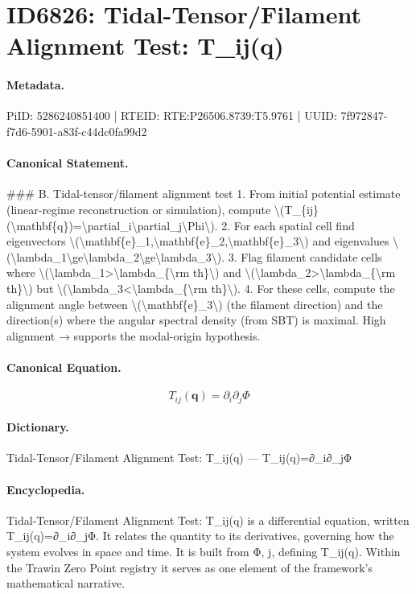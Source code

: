 \section*{ID6826: Tidal-Tensor/Filament Alignment Test: T\_ij(q)}
\paragraph{Metadata.}
PiID: 5286240851400 | RTEID: RTE:P26506.8739:T5.9761 | UUID: 7f972847-f7d6-5901-a83f-c44dc0fa99d2

\paragraph{Canonical Statement.}
\#\#\# B. Tidal-tensor/filament alignment test 1. From initial potential estimate (linear-regime reconstruction or simulation), compute \textbackslash{}(T\_\{ij\}(\textbackslash{}mathbf\{q\})=\textbackslash{}partial\_i\textbackslash{}partial\_j\textbackslash{}Phi\textbackslash{}). 2. For each spatial cell find eigenvectors \textbackslash{}(\textbackslash{}mathbf\{e\}\_1,\textbackslash{}mathbf\{e\}\_2,\textbackslash{}mathbf\{e\}\_3\textbackslash{}) and eigenvalues \textbackslash{}(\textbackslash{}lambda\_1\textbackslash{}ge\textbackslash{}lambda\_2\textbackslash{}ge\textbackslash{}lambda\_3\textbackslash{}). 3. Flag filament candidate cells where \textbackslash{}(\textbackslash{}lambda\_1>\textbackslash{}lambda\_\{\textbackslash{}rm th\}\textbackslash{}) and \textbackslash{}(\textbackslash{}lambda\_2>\textbackslash{}lambda\_\{\textbackslash{}rm th\}\textbackslash{}) but \textbackslash{}(\textbackslash{}lambda\_3<\textbackslash{}lambda\_\{\textbackslash{}rm th\}\textbackslash{}). 4. For these cells, compute the alignment angle between \textbackslash{}(\textbackslash{}mathbf\{e\}\_3\textbackslash{}) (the filament direction) and the direction(s) where the angular spectral density (from SBT) is maximal. High alignment → supports the modal-origin hypothesis.

\paragraph{Canonical Equation.}
\[
T_{ij}(\mathbf{q})=\partial_i\partial_j\Phi
\]

\paragraph{Dictionary.}
Tidal-Tensor/Filament Alignment Test: T\_ij(q) — T\_ij(q)=∂\_i∂\_jΦ

\paragraph{Encyclopedia.}
Tidal-Tensor/Filament Alignment Test: T\_ij(q) is a differential equation, written T\_ij(q)=∂\_i∂\_jΦ. It relates the quantity to its derivatives, governing how the system evolves in space and time. It is built from Φ, j, defining T\_ij(q). Within the Trawin Zero Point registry it serves as one element of the framework's mathematical narrative.

